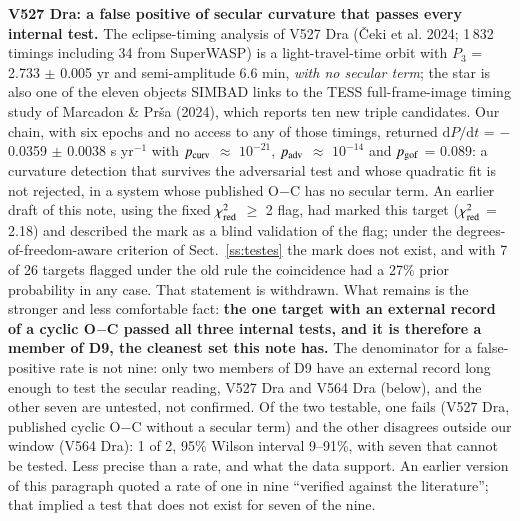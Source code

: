 \documentclass{aa}
\begin{document}
\textbf{V527 Dra: a false positive of secular curvature that passes every internal test.} The eclipse-timing analysis of V527 Dra (Čeki et al. 2024; 1\,832 timings including 34 from SuperWASP) is a light-travel-time orbit with $P_3$ = 2.733 $\pm$ 0.005 yr and semi-amplitude 6.6 min, \emph{with no secular term}; the star is also one of the eleven objects SIMBAD links to the TESS full-frame-image timing study of Marcadon \& Prša (2024), which reports ten new triple candidates. Our chain, with six epochs and no access to any of those timings, returned $\mathrm{d}P/\mathrm{d}t$ = $-$0.0359 $\pm$ 0.0038 s yr$^{-1}$ with $p_{\rm curv}$ $\approx$ $10^{-21}$, $p_{\rm adv}$ $\approx$ $10^{-14}$ and $p_{\rm gof}$ = 0.089: a curvature detection that survives the adversarial test and whose quadratic fit is not rejected, in a system whose published O$-$C has no secular term. An earlier draft of this note, using the fixed $\chi^2_{\rm red}$ $\ge$ 2 flag, had marked this target ($\chi^2_{\rm red}$ = 2.18) and described the mark as a blind validation of the flag; under the degrees-of-freedom-aware criterion of Sect.~\ref{ss:testes} the mark does not exist, and with 7 of 26 targets flagged under the old rule the coincidence had a 27\% prior probability in any case. That statement is withdrawn. What remains is the stronger and less comfortable fact: \textbf{the one target with an external record of a cyclic O$-$C passed all three internal tests, and it is therefore a member of D9, the cleanest set this note has.} The denominator for a false-positive rate is not nine: only two members of D9 have an external record long enough to test the secular reading, V527 Dra and V564 Dra (below), and the other seven are untested, not confirmed. Of the two testable, one fails (V527 Dra, published cyclic O$-$C without a secular term) and the other disagrees outside our window (V564 Dra): 1 of 2, 95\% Wilson interval 9--91\%, with seven that cannot be tested. Less precise than a rate, and what the data support. An earlier version of this paragraph quoted a rate of one in nine ``verified against the literature''; that implied a test that does not exist for seven of the nine.
\end{document}
